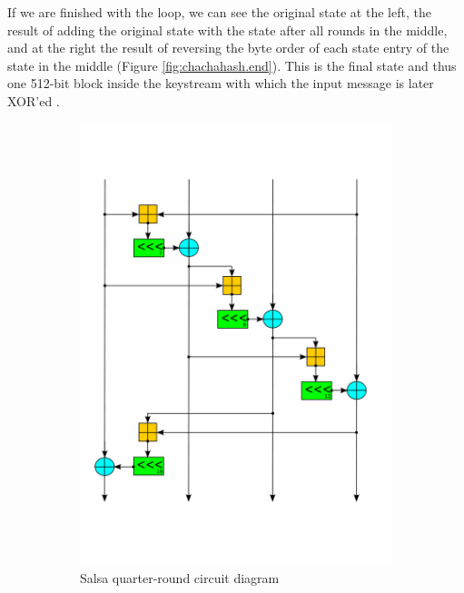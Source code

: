 If we are finished with the loop, we can see the original state at the left, the result of adding the original state with the state after all rounds in the middle, and at the right the result of reversing the byte order of each state entry of the state in the middle (Figure \ref{fig:chachahash.end}). This is the final state and thus one 512-bit block inside the keystream with which the input message is later XOR'ed .

\begin{figure}
\centering
\begin{subfigure}[t]{0.5\textwidth}
  \centering
  \includegraphics[width=\textwidth]{figures/wiki-qr-circuit/salsa-wiki-qr-circuit.png}
  \caption[Salsa quarter-round circuit diagram]{Salsa quarter-round circuit diagram}
  \label{fig:wiki.qr.circuit.salsa}
\end{subfigure}%
\begin{subfigure}[t]{0.5\textwidth}

\end{subfigure}
\end{figure}
